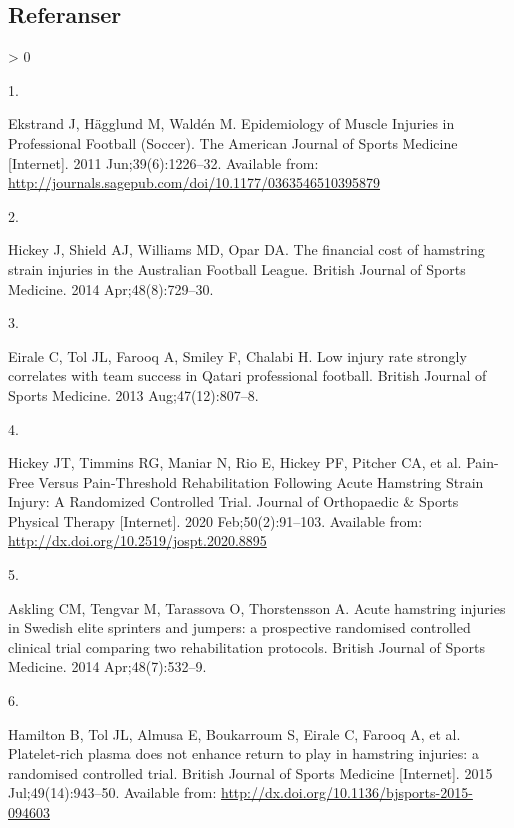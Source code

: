 \documentclass[
]{article}
\newlength{\cslhangindent}
\newlength{\csllabelwidth}
\newenvironment{CSLReferences}[2] %
 {%
  \setlength{\parindent}{0pt}
  \ifodd #1 \everypar{\setlength{\hangindent}{\cslhangindent}}\ignorespaces\fi
  \ifnum #2 > 0
  \setlength{\parskip}{#2\baselineskip}
  \fi
 }%
 {}
\newcommand{\CSLLeftMargin}[1]{\parbox[t]{\csllabelwidth}{#1}}
\newcommand{\CSLRightInline}[1]{\parbox[t]{\linewidth - \csllabelwidth}{#1}\break}
\begin{document}
\hypertarget{referanser}{%
\subsection*{Referanser}\label{referanser}}

\hypertarget{refs}{}
\begin{CSLReferences}{0}{0}
\leavevmode\hypertarget{ref-ekstrand2011}{}%
\CSLLeftMargin{1. }
\CSLRightInline{Ekstrand J, Hägglund M, Waldén M. Epidemiology of Muscle
Injuries in Professional Football (Soccer). The American Journal of
Sports Medicine {[}Internet{]}. 2011 Jun;39(6):1226--32. Available from:
\url{http://journals.sagepub.com/doi/10.1177/0363546510395879}}

\leavevmode\hypertarget{ref-hickey2014}{}%
\CSLLeftMargin{2. }
\CSLRightInline{Hickey J, Shield AJ, Williams MD, Opar DA. The financial
cost of hamstring strain injuries in the Australian Football League.
British Journal of Sports Medicine. 2014 Apr;48(8):729--30. }

\leavevmode\hypertarget{ref-eirale2013}{}%
\CSLLeftMargin{3. }
\CSLRightInline{Eirale C, Tol JL, Farooq A, Smiley F, Chalabi H. Low
injury rate strongly correlates with team success in Qatari professional
football. British Journal of Sports Medicine. 2013 Aug;47(12):807--8. }

\leavevmode\hypertarget{ref-hickey2020}{}%
\CSLLeftMargin{4. }
\CSLRightInline{Hickey JT, Timmins RG, Maniar N, Rio E, Hickey PF,
Pitcher CA, et al. Pain-Free Versus Pain-Threshold Rehabilitation
Following Acute Hamstring Strain Injury: A Randomized Controlled Trial.
Journal of Orthopaedic \& Sports Physical Therapy {[}Internet{]}. 2020
Feb;50(2):91--103. Available from:
\url{http://dx.doi.org/10.2519/jospt.2020.8895}}

\leavevmode\hypertarget{ref-askling2014}{}%
\CSLLeftMargin{5. }
\CSLRightInline{Askling CM, Tengvar M, Tarassova O, Thorstensson A.
Acute hamstring injuries in Swedish elite sprinters and jumpers: a
prospective randomised controlled clinical trial comparing two
rehabilitation protocols. British Journal of Sports Medicine. 2014
Apr;48(7):532--9. }

\leavevmode\hypertarget{ref-hamilton2015}{}%
\CSLLeftMargin{6. }
\CSLRightInline{Hamilton B, Tol JL, Almusa E, Boukarroum S, Eirale C,
Farooq A, et al. Platelet-rich plasma does not enhance return to play in
hamstring injuries: a randomised controlled trial. British Journal of
Sports Medicine {[}Internet{]}. 2015 Jul;49(14):943--50. Available from:
\url{http://dx.doi.org/10.1136/bjsports-2015-094603}}


\end{CSLReferences}
\end{document}
